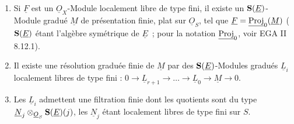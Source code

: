 \begin{enumerate}[label=\alph*)]
\item Si \(\underline{F}\) est un \(\underline{O}_X\)-Module localement libre de type fini, il existe un \(\mathbf{S}(\underline{E})\)-Module gradué \(\underline{M}\) de présentation finie, plat sur \(\underline{O}_S\), tel que \(\underline{F}=\underline{\operatorname{Proj}}_0(\underline{M})\) (\(\mathbf{S}(\underline{E})\) étant l'algèbre symétrique de \(\underline{E}\)~; pour la notation \(\underline{\operatorname{Proj}}_0\), voir EGA II 8.12.1).

\item Il existe une résolution graduée finie de \(\underline{M}\) par des \(\mathbf{S}(\underline{E})\)-Modules gradués \(\underline{L}_i\) localement libres de type fini : \(0\longrightarrow \underline{L}_{r+1}\longrightarrow\ldots\longrightarrow \underline{L}_0\longrightarrow \underline{M}\longrightarrow 0\).

\item Les \(\underline{L}_i\) admettent une filtration finie dont les quotients sont du type \(\underline{N}_j\otimes_{\underline{O}_S}\mathbf{S}(\underline{E})(j)\), les \(\underline{N}_j\) étant localement libres de type fini sur \(S\).
\end{enumerate}

